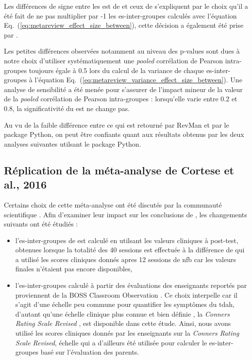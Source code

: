 Les différences de signe entre les \gls{est} de \citet{Cortese2016} et ceux de \citet{Bussalb2019a} s'expliquent par le choix qu'il a été fait de ne pas multiplier
par -1 les \gls{es}-inter-groupes calculés avec l'équation Eq.~(\ref{eq:metareview_effect_size_between}), cette décision a également été prise par 
\citet{Micoulaud2014}.

Les petites différences observées notamment au niveau des p-values sont dues à notre choix d'utiliser systématiquement une \textit{pooled} corrélation de Pearson 
intra-groupes toujours égale à 0.5 \citep{Balk2012} lors du calcul de la variance de chaque \gls{es}-inter-groupes à l'équation 
Eq.~(\ref{eq:metareview_variance_effect_size_between}). Une analyse de sensibilité a été menée pour s'assurer de l'impact mineur de la valeur de la \textit{pooled} 
corrélation de Pearson intra-groupes : lorsqu'elle varie entre 0.2 et 0.8, la significativité du \gls{est} ne change pas.

Au vu de la faible différence entre ce qui est retourné par RevMan et par le package Python, on peut être confiants quant aux résultats obtenus par les 
deux analyses suivantes utilsant le package Python. 

\subsection{Réplication de la méta-analyse de Cortese et al., 2016}

Certains choix de cette méta-analyse ont été discutés par la communauté scientifique \citep{Micoulaud2016}. Afin d'examiner leur impact sur les conclusions
de \citet{Cortese2016}, les changements suivants ont été étudiés :

\begin{itemize}
\item l'\gls{es}-inter-groupes de \citet{Arnold2014} est calculé en utilsant les valeurs cliniques à post-test, obtenues lorsque la totalité des 40 sessions 
est effectuée à la différence de \citet{Cortese2016} qui a utilisé les scores cliniques donnés apres 12 sessions de \gls{nfb} car les valeurs finales n'étaient 
pas encore disponibles,
\item l'\gls{es}-inter-groupes calculé à partir des évaluations des enseignants reportés par \citet{Steiner2014} proviennent de la BOSS Classroom Observation
\citep{Shapiro2010}. Ce choix interpelle car il s'agit d'une échelle peu commune pour quantifier les symptômes du \gls{tdah}, d'autant qu'une échelle clinique 
plus connue et bien définie \citep{Collett2003, Epstein2012}, la \textit{Conners Rating Scale Revised} \citep{Conners1998, Bluschke2016}, est disponible dans 
cette étude. Ainsi, nous avons utilisé les scores cliniques donnés par les enseignants sur la \textit{Conners Rating Scale Revised}, échelle 
qui a d'ailleurs été utilisée pour calculer le \gls{es}-inter-groupes basé sur l'évaluation des parents. 
\end{itemize}

